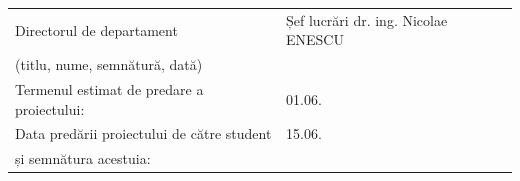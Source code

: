 \begin{tabular}{ l l }
	Directorul de departament & Șef lucrări dr. ing. Nicolae ENESCU \\
	(titlu, nume, semnătură, dată)\vspace{10pt} &  \\
	
	Termenul estimat de predare a proiectului: \vspace{10pt} & 01.06.\the\year \\
		
	Data predării proiectului de către student & 15.06.\the\year\\
	și semnătura acestuia:\vspace{10pt} & \\
\end{tabular}

